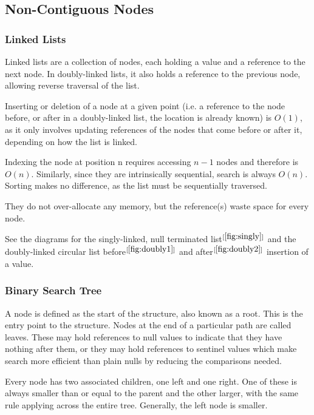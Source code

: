 \documentclass[]{article}
\begin{document}
\pagebreak

\subsection{Non-Contiguous Nodes}

\subsubsection{Linked Lists}

Linked lists are a collection of nodes, each holding a value and a reference to the next node. In doubly-linked lists, it also holds a reference to the previous node, allowing reverse traversal of the list.

Inserting or deletion of a node at a given point (i.e. a reference to the node before, or after in a doubly-linked list, the location is already known) is $O(1)$, as it only involves updating references of the nodes that come before or after it, depending on how the list is linked.

Indexing the node at position n requires accessing $n-1$ nodes and therefore is $O(n)$. Similarly, since they are intrinsically sequential, search is always $O(n)$. Sorting makes no difference, as the list must be sequentially traversed.

They do not over-allocate any memory, but the reference(s) waste space for every node.

See the diagrams for the singly-linked, null terminated list$^{[\ref{fig:singly}]}$ and the doubly-linked circular list before$^{[\ref{fig:doubly1}]}$ and after$^{[\ref{fig:doubly2}]}$ insertion of a value.

\subsubsection{Binary Search Tree}

A node is defined as the start of the structure, also known as a root. This is the entry point to the structure. Nodes at the end of a particular path are called leaves. These may hold references to null values to indicate that they have nothing after them, or they may hold references to sentinel values which make search more efficient than plain nulls by reducing the comparisons needed.

Every node has two associated children, one left and one right. One of these is always smaller than or equal to the parent and the other larger, with the same rule applying across the entire tree. Generally, the left node is smaller.
\end{document}

